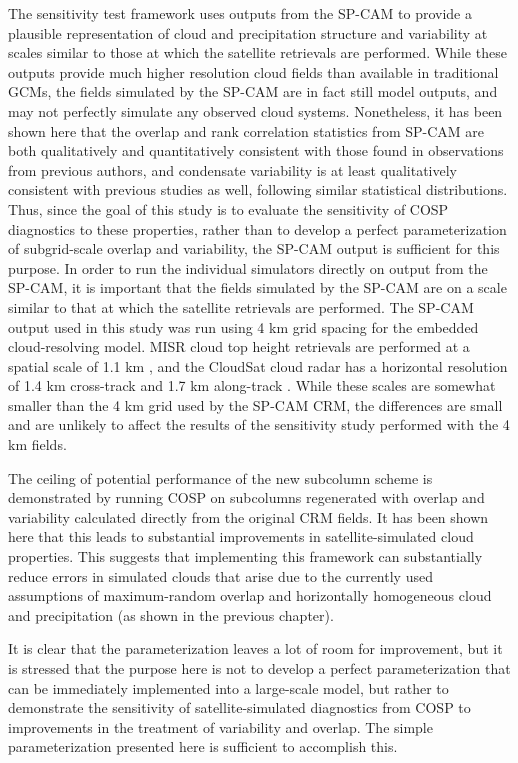 The sensitivity test framework uses outputs from the SP-CAM to provide a
plausible representation of cloud and precipitation structure and
variability at scales similar to those at which the satellite retrievals
are performed. While these outputs provide much higher resolution cloud
fields than available in traditional GCMs, the fields simulated by the
SP-CAM are in fact still model outputs, and may not perfectly simulate
any observed cloud systems. Nonetheless, it has been shown here that the
overlap and rank correlation statistics from SP-CAM are both
qualitatively and quantitatively consistent with those found in
observations from previous authors, and condensate variability is at
least qualitatively consistent with previous studies as well, following
similar statistical distributions. Thus, since the goal of this study is
to evaluate the sensitivity of COSP diagnostics to these properties,
rather than to develop a perfect parameterization of subgrid-scale
overlap and variability, the SP-CAM output is sufficient for this
purpose. In order to run the individual simulators directly on output
from the SP-CAM, it is important that the fields simulated by the SP-CAM
are on a scale similar to that at which the satellite retrievals are
performed. The SP-CAM output used in this study was run using 4 km grid
spacing for the embedded cloud-resolving model. MISR cloud top height
retrievals are performed at a spatial scale of 1.1 km
\citep{moroney_et_al_2002}, and the CloudSat cloud radar has a
horizontal resolution of 1.4 km cross-track and 1.7 km along-track
\citep{tanelli_et_al_2008}. While these scales are somewhat smaller than
the 4 km grid used by the SP-CAM CRM, the differences are small and are
unlikely to affect the results of the sensitivity study performed with
the 4 km fields.

The ceiling of potential performance of the new subcolumn scheme is
demonstrated by running COSP on subcolumns regenerated with overlap and
variability calculated directly from the original CRM fields. It has
been shown here that this leads to substantial improvements in
satellite-simulated cloud properties. This suggests that implementing
this framework can substantially reduce errors in simulated clouds that
arise due to the currently used assumptions of maximum-random overlap
and horizontally homogeneous cloud and precipitation (as shown in the
previous chapter).

It is clear that the parameterization leaves a lot of room for
improvement, but it is stressed that the purpose here is not to develop
a perfect parameterization that can be immediately implemented into a
large-scale model, but rather to demonstrate the sensitivity of
satellite-simulated diagnostics from COSP to improvements in the
treatment of variability and overlap. The simple parameterization
presented here is sufficient to accomplish this.

